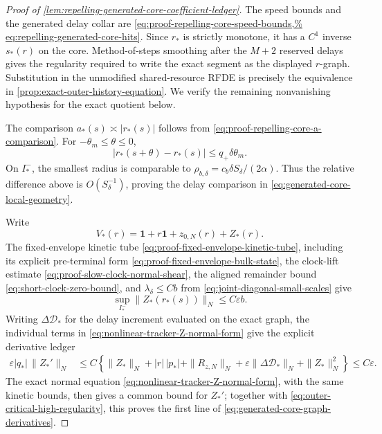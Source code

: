 \begin{proof}[Proof of
\cref{lem:repelling-generated-core-coefficient-ledger}]
The speed bounds and the generated delay collar are
\cref{eq:proof-repelling-core-speed-bounds,%
eq:repelling-generated-core-hits}.  Since \(r_*\) is strictly monotone,
it has a \(C^1\) inverse \(s_*(r)\) on the core.  Method-of-steps
smoothing after the \(M+2\) reserved delays gives the regularity required
to write the exact segment as the displayed \(r\)-graph.  Substitution
in the unmodified shared-resource RFDE is precisely the equivalence in
\cref{prop:exact-outer-history-equation}.  We verify the remaining
nonvanishing hypothesis for the exact quotient below.

The comparison \(a_*(s)\asymp|r_*(s)|\) follows from
\cref{eq:proof-repelling-core-a-comparison}.  For
\(-\theta_m\le\theta\le0\),
\[
 |r_*(s+\theta)-r_*(s)|\le q_+\delta\theta_m.
\]
On \(I_*^-\), the smallest radius is comparable to
\(\rho_{b,\delta}=c_b\delta S_\delta/(2\alpha)\).
Thus the relative difference above is \(O(S_\delta^{-1})\), proving the
delay comparison in
\cref{eq:generated-core-local-geometry}.

Write
\[
 V_*(r)=\mathbf1+r\mathbf1+z_{0,N}(r)+Z_*(r).
\]
The fixed-envelope kinetic tube
\cref{eq:proof-fixed-envelope-kinetic-tube}, including its explicit
pre-terminal form \cref{eq:proof-fixed-envelope-bulk-state}, the clock-lift estimate
\cref{eq:proof-slow-clock-normal-shear}, the aligned remainder bound
\cref{eq:short-clock-zero-bound}, and
\(\lambda_\delta\le Cb\) from
\cref{eq:joint-diagonal-small-scales} give
\begin{equation}
 \sup_{I_*^-}\|Z_*(r_*(s))\|_N\le C\varepsilon b.            \label{eq:proof-generated-core-normal-size}
\end{equation}
Writing \(\Delta\mathcal D_*\) for the delay increment evaluated on the
exact graph, the individual terms in
\cref{eq:nonlinear-tracker-Z-normal-form} give the explicit derivative
ledger
\begin{align}
 \varepsilon |q_*|\,\|Z_*'\|_N
 &\le C\left\{\|Z_*\|_N+|r|\,|p_*|+\|R_{z,N}\|_N
       +\varepsilon\|\Delta\mathcal D_*\|_N+\|Z_*\|_N^2\right\}
 \le C\varepsilon.                              \label{eq:proof-generated-core-Z-prime-ledger}
\end{align}
The exact normal equation
\cref{eq:nonlinear-tracker-Z-normal-form}, with the same kinetic bounds,
then gives a common bound for \(Z_*'\); together with
\cref{eq:outer-critical-high-regularity}, this proves the first line of
\cref{eq:generated-core-graph-derivatives}.


\end{proof}
